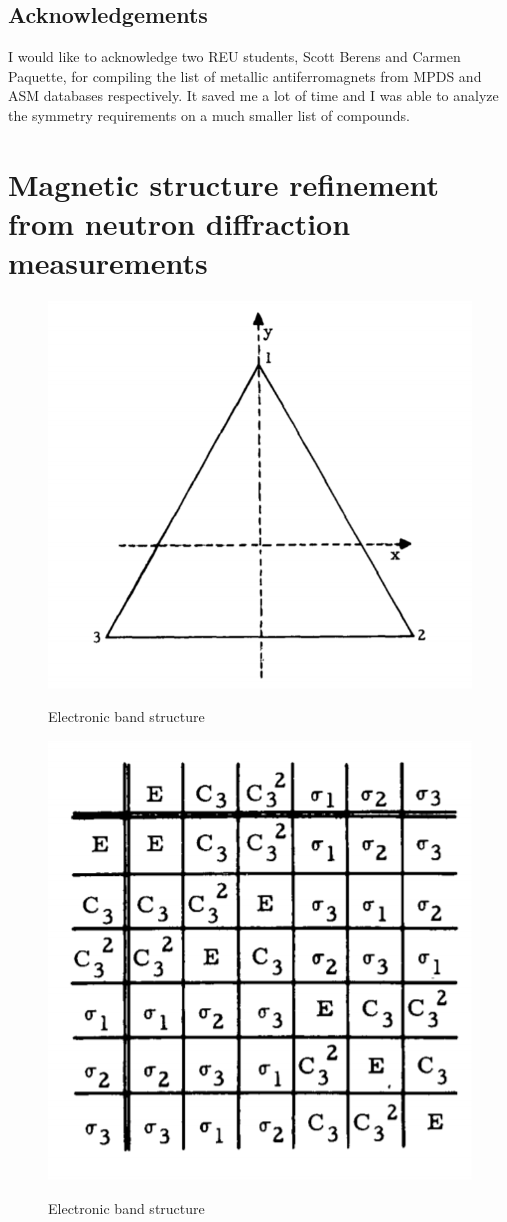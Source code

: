 \documentclass[11pt,edeposit,draftthesis]{uiucthesis2020}
\begin{document}
\begin{mainmatter}
\section{Acknowledgements}


I would like to acknowledge two REU students, Scott Berens and Carmen Paquette, for compiling the list of metallic antiferromagnets from MPDS and ASM databases respectively. It saved me a lot of time and I was able to analyze the symmetry requirements on a much smaller list of compounds.

\chapter{Magnetic structure refinement from neutron diffraction measurements}

\begin{figure}
\centering\includegraphics[width=0.5\columnwidth]{figures/ch3/C3v.png} \\
\caption{\label{fig:C3v}
Electronic band structure
}
\end{figure}

\begin{figure}
\centering\includegraphics[width=0.5\columnwidth]{figures/ch3/group_multiplication_table_C3v.png} \\
\caption{\label{fig:gmt_C3v}
Electronic band structure
}
\end{figure}


\end{mainmatter}
\end{document}
